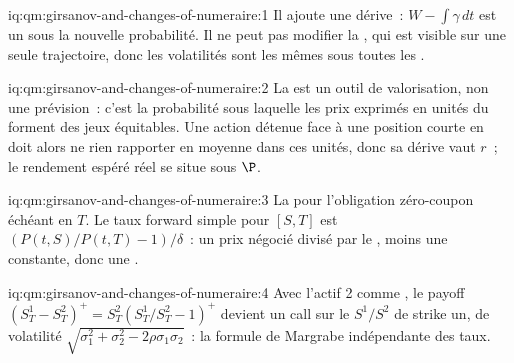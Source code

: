 \begin{solution}{iq:qm:girsanov-and-changes-of-numeraire:1}
Il ajoute une dérive~: $W - \int\gamma\,dt$ est un  sous la nouvelle probabilité. Il ne peut pas modifier la
, qui est visible sur une seule trajectoire, donc les volatilités sont les mêmes sous toutes les
.
\end{solution}

\begin{solution}{iq:qm:girsanov-and-changes-of-numeraire:2}
La  est un outil de valorisation, non une prévision~: c'est la probabilité sous laquelle les prix
exprimés en unités du  forment des jeux équitables. Une action détenue face à une position courte
en  doit alors ne rien rapporter en moyenne dans ces unités, donc sa dérive vaut $r$~; le
rendement espéré réel se situe sous $\P$.
\end{solution}

\begin{solution}{iq:qm:girsanov-and-changes-of-numeraire:3}
La  pour l'obligation zéro-coupon échéant en $T$. Le taux forward simple pour
$[S, T]$ est $(P(t,S)/P(t,T) - 1)/\delta$~: un prix négocié divisé par le , moins une constante, donc une
.
\end{solution}

\begin{solution}{iq:qm:girsanov-and-changes-of-numeraire:4}
Avec l'actif 2 comme , le payoff $(S^1_T - S^2_T)^+ = S^2_T(S^1_T/S^2_T - 1)^+$ devient un call sur le
 $S^1/S^2$ de strike un, de volatilité $\sqrt{\sigma_1^2 + \sigma_2^2 - 2\rho\sigma_1\sigma_2}$~: la formule de Margrabe
indépendante des taux.
\end{solution}

